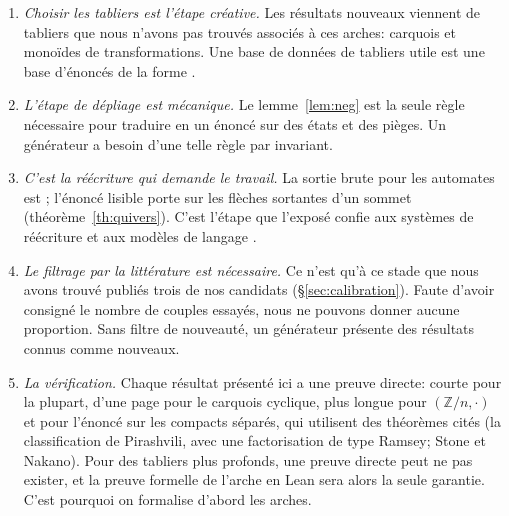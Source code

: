 \begin{enumerate}
\item \emph{Choisir les tabliers est l'étape créative.} Les résultats nouveaux viennent de tabliers que nous n'avons pas trouvés associés à ces arches: carquois et monoïdes de transformations. Une base de données de tabliers utile est une base d'énoncés de la forme .
\item \emph{L'étape de dépliage est mécanique.} Le lemme~\ref{lem:neg} est la seule règle nécessaire pour traduire  en un énoncé sur des états et des pièges. Un générateur a besoin d'une telle règle par invariant.
\item \emph{C'est la réécriture qui demande le travail.} La sortie brute pour les automates est ; l'énoncé lisible porte sur les flèches sortantes d'un sommet (théorème~\ref{th:quivers}). C'est l'étape que l'exposé confie aux systèmes de réécriture et aux modèles de langage \cite[transparent 17]{caramello-mines}.
\item \emph{Le filtrage par la littérature est nécessaire.} Ce n'est qu'à ce stade que nous avons trouvé publiés trois de nos candidats (\S\ref{sec:calibration}). Faute d'avoir consigné le nombre de couples essayés, nous ne pouvons donner aucune proportion. Sans filtre de nouveauté, un générateur présente des résultats connus comme nouveaux.
\item \emph{La vérification.} Chaque résultat présenté ici a une preuve directe: courte pour la plupart, d'une page pour le carquois cyclique, plus longue pour $(\mathbb Z/n,\cdot)$ et pour l'énoncé sur les compacts séparés, qui utilisent des théorèmes cités (la classification de Pirashvili, avec une factorisation de type Ramsey; Stone et Nakano). Pour des tabliers plus profonds, une preuve directe peut ne pas exister, et la preuve formelle de l'arche en Lean sera alors la seule garantie. C'est pourquoi on formalise d'abord les arches.
\end{enumerate}
